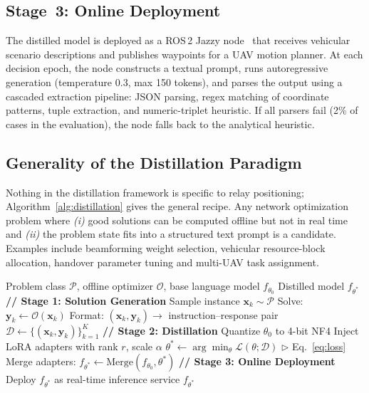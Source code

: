 \documentclass[journal]{IEEEtran}
\begin{document}
\subsection{Stage~3: Online Deployment}

The distilled model is deployed as a ROS\,2 Jazzy node~\cite{macenski2022ros2} that receives vehicular scenario descriptions and publishes waypoints for a UAV motion planner. At each decision epoch, the node constructs a textual prompt, runs autoregressive generation (temperature 0.3, max 150 tokens), and parses the output using a cascaded extraction pipeline: JSON parsing, regex matching of coordinate patterns, tuple extraction, and numeric-triplet heuristic. If all parsers fail (2\% of cases in the evaluation), the node falls back to the analytical heuristic.

\subsection{Generality of the Distillation Paradigm}

Nothing in the distillation framework is specific to relay positioning; Algorithm~\ref{alg:distillation} gives the general recipe. Any network optimization problem where \emph{(i)} good solutions can be computed offline but not in real time and \emph{(ii)} the problem state fits into a structured text prompt is a candidate. Examples include beamforming weight selection, vehicular resource-block allocation, handover parameter tuning and multi-UAV task assignment.

\begin{algorithm}[!t]
\caption{Optimizer Distillation for Real-Time Network Optimization}
\label{alg:distillation}
\begin{algorithmic}[1]
\renewcommand{\algorithmicrequire}{\textbf{Input:}}
\renewcommand{\algorithmicensure}{\textbf{Output:}}
\REQUIRE Problem class $\mathcal{P}$, offline optimizer $\mathcal{O}$, base language model $f_{\theta_0}$
\ENSURE Distilled model $f_{\theta^*}$
\STATE \textbf{// Stage 1: Solution Generation}
    \STATE Sample instance $\mathbf{x}_k \sim \mathcal{P}$
    \STATE Solve: $\mathbf{y}_k \leftarrow \mathcal{O}(\mathbf{x}_k)$
    \STATE Format: $(\mathbf{x}_k, \mathbf{y}_k) \rightarrow$ instruction--response pair
\ENDFOR
\STATE $\mathcal{D} \leftarrow \{(\mathbf{x}_k, \mathbf{y}_k)\}_{k=1}^{K}$
\STATE \textbf{// Stage 2: Distillation}
\STATE Quantize $\theta_0$ to 4-bit NF4
\STATE Inject LoRA adapters with rank $r$, scale $\alpha$
\STATE $\theta^* \leftarrow \arg\min_\theta \mathcal{L}(\theta; \mathcal{D})$ \hfill $\triangleright$ Eq.~\eqref{eq:loss}
\STATE Merge adapters: $f_{\theta^*} \leftarrow \text{Merge}(f_{\theta_0}, \theta^*)$
\STATE \textbf{// Stage 3: Online Deployment}
\STATE Deploy $f_{\theta^*}$ as real-time inference service
\RETURN $f_{\theta^*}$
\end{algorithmic}
\end{algorithm}
\end{document}
